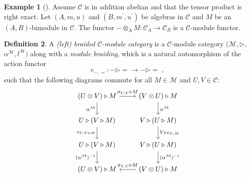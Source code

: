 \documentclass[12pt,dvipsnames]{article}
\numberwithin{equation}{section}
\theoremstyle{definition}
\newtheorem{definition}{Definition}[section]
\newtheorem{example}[definition]{Example}
\newcommand{\cat}[1]{\mathcal{#1}}
\newcommand{\1}{\ensuremath{\mathbbm{1}}}
\newcommand{\blank}{{-}}
\newcommand{\bblank}{{=}}
\begin{document}
\begin{example}[{\cite[Sec.\,7.8]{EGNO15}}]
    Assume $\cat{C}$ is 
    in addition abelian and that the tensor product is right exact. Let $(A,m,u)$ and $(B,m^\prime,u^\prime)$ be algebras in $\cat{C}$ and $M$ be an $(A,B)$-bimodule in $\cat{C}$. The functor $\blank\otimes_A M:\cat{C}_A\to\cat{C}_B$ is a $\cat{C}$-module functor.
\end{example}
\begin{definition}
    A \emph{(left) braided $\cat{C}$-module category} is a $\cat{C}$-module category $(\cat{M},\triangleright$, $\alpha^\cat{M},l^\cat{M})$ along with a \emph{module braiding}, which is a natural automorphism of the action functor
    \begin{equation}
        e_{\blank,\bblank}: \blank\triangleright \bblank \rightarrow \blank\triangleright \bblank \;,
    \end{equation}
    such that the following diagrams commute for all $M\in\cat{M}$ and $U,V\in\cat{C}$:
    \begin{subequations}
            \begin{equation}\label{eq:BrM1}
                \begin{tikzcd}
                    (U\otimes V)\triangleright M
                        & (V\otimes U)\triangleright M \\
                    U\triangleright(V\triangleright M)
                        & V\triangleright(U\triangleright M) \\
                    U\triangleright(V\triangleright M)
                        & V\triangleright(U\triangleright M) \\
                    (U\otimes V)\triangleright M
                        & (V\otimes U)\triangleright M
                    \arrow["{\sigma_{U,V}\triangleright M}",
                        from=1-1, to=1-2]
                    \arrow["{\alpha^\cat{M}}"',
                        from=1-1, to=2-1]
                    \arrow["{e_{U,V\triangleright M}}"',
                        from=2-1, to=3-1]
                    \arrow["{(\alpha^\cat{M})^{-1}}"',
                        from=3-1, to=4-1]
                    \arrow["{\alpha^\cat{M}}",
                        from=1-2, to=2-2]
                    \arrow["{V\triangleright e_{U,M}}",
                        from=2-2, to=3-2]
                    \arrow["{(\alpha^\cat{M})^{-1}}",
                        from=3-2, to=4-2]
                    \arrow["{\sigma_{V,U}\triangleright M}"',
                        from=4-2, to=4-1]
                \end{tikzcd}

\end{equation}
\end{subequations}
\end{definition}
\end{document}
